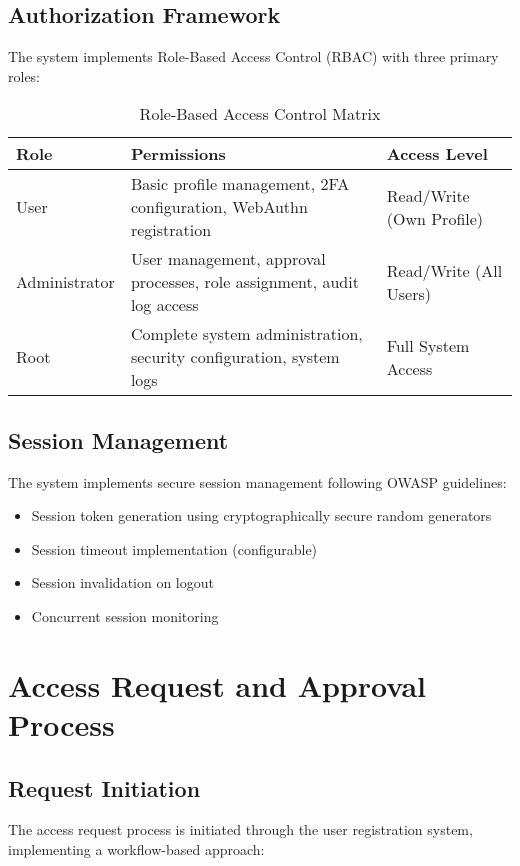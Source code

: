 \documentclass[12pt,a4paper]{article}
\begin{document}
\subsection{Authorization Framework}
The system implements Role-Based Access Control (RBAC) with three primary roles:

\begin{table}[H]
\centering
\begin{tabularx}{\textwidth}{|l|X|l|}
\hline
\textbf{Role} & \textbf{Permissions} & \textbf{Access Level} \\
\hline
User & Basic profile management, 2FA configuration, WebAuthn registration & Read/Write (Own Profile) \\
\hline
Administrator & User management, approval processes, role assignment, audit log access & Read/Write (All Users) \\
\hline
Root & Complete system administration, security configuration, system logs & Full System Access \\
\hline
\end{tabularx}
\caption{Role-Based Access Control Matrix}
\label{tab:rbac}
\end{table}

\subsection{Session Management}
The system implements secure session management following OWASP guidelines:

\begin{itemize}
    \item Session token generation using cryptographically secure random generators
    \item Session timeout implementation (configurable)
    \item Session invalidation on logout
    \item Concurrent session monitoring
\end{itemize}

\section{Access Request and Approval Process}

\subsection{Request Initiation}
The access request process is initiated through the user registration system, implementing a workflow-based approach:
\end{document}

